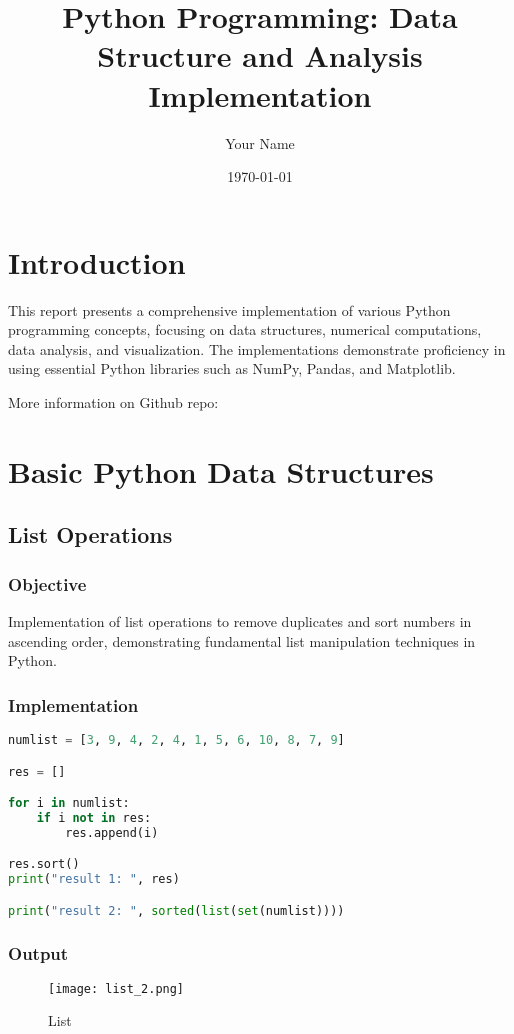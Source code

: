 \documentclass[12pt]{article}
\title{Python Programming: Data Structure and Analysis Implementation}
\author{Your Name}
\date{\today}
\begin{document}
 
  
\newpage

\section{Introduction}
This report presents a comprehensive implementation of various Python programming concepts, focusing on data structures, numerical computations, data analysis, and visualization. The implementations demonstrate proficiency in using essential Python libraries such as NumPy, Pandas, and Matplotlib.

\vspace{1em}
\noindent
More information on Github repo: \href{https://github.com/sabbirahmed404/Python-Practice}{\faGithub}

\section{Basic Python Data Structures}

\subsection{List Operations\hfill\href{https://github.com/sabbirahmed404/Python-Practice/blob/main/list.py}{\faGithub}}
\subsubsection{Objective}
Implementation of list operations to remove duplicates and sort numbers in ascending order, demonstrating fundamental list manipulation techniques in Python.

\subsubsection{Implementation}
\begin{lstlisting}[language=Python, caption=List Operations Implementation]
numlist = [3, 9, 4, 2, 4, 1, 5, 6, 10, 8, 7, 9]

res = []

for i in numlist:
    if i not in res:
        res.append(i)

res.sort()
print("result 1: ", res)

print("result 2: ", sorted(list(set(numlist))))
\end{lstlisting}

\subsubsection{Output}
\begin{figure}[!h]
    \centering
    \texttt{[image: list\_2.png]}
    \caption{List}
    \label{fig:enter-label}
\end{figure}
\end{document}
